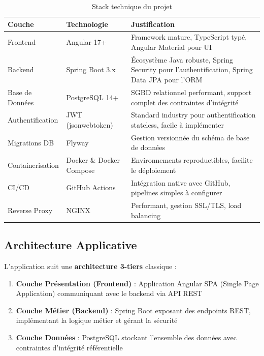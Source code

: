 \documentclass[12pt,a4paper]{report}
\begin{document}
\begin{table}[H]
\centering
\caption{Stack technique du projet}
\begin{tabular}{|p{3cm}|p{4cm}|p{7cm}|}
\hline
\textbf{Couche} & \textbf{Technologie} & \textbf{Justification} \\
\hline
Frontend & Angular 17+ & Framework mature, TypeScript typé, Angular Material pour UI \\
\hline
Backend & Spring Boot 3.x & Écosystème Java robuste, Spring Security pour l'authentification, Spring Data JPA pour l'ORM \\
\hline
Base de Données & PostgreSQL 14+ & SGBD relationnel performant, support complet des contraintes d'intégrité \\
\hline
Authentification & JWT (jsonwebtoken) & Standard industry pour authentification stateless, facile à implémenter \\
\hline
Migrations DB & Flyway & Gestion versionnée du schéma de base de données \\
\hline
Containerisation & Docker \& Docker Compose & Environnements reproductibles, facilite le déploiement \\
\hline
CI/CD & GitHub Actions & Intégration native avec GitHub, pipelines simples à configurer \\
\hline
Reverse Proxy & NGINX & Performant, gestion SSL/TLS, load balancing \\
\hline
\end{tabular}
\end{table}

\subsection{Architecture Applicative}

L'application suit une \textbf{architecture 3-tiers} classique :

\begin{enumerate}[itemsep=0.5em]
    \item \textbf{Couche Présentation (Frontend)} : Application Angular SPA (Single Page Application) communiquant avec le backend via API REST
    \item \textbf{Couche Métier (Backend)} : Spring Boot exposant des endpoints REST, implémentant la logique métier et gérant la sécurité
    \item \textbf{Couche Données} : PostgreSQL stockant l'ensemble des données avec contraintes d'intégrité référentielle
\end{enumerate}
\end{document}
